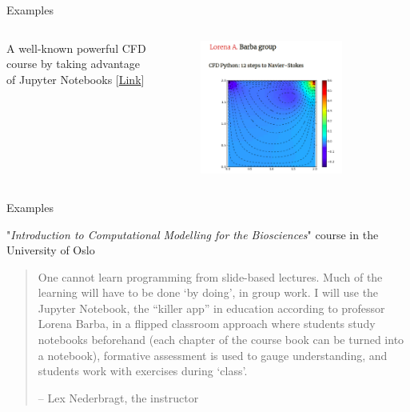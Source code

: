\documentclass[11pt,t]{beamer}
\begin{document}
\begin{frame}[fragile]{Examples}  

	\begin{columns}[t]
		\begin{column}{.3\textwidth}
		A well-known powerful CFD course by taking advantage of Jupyter Notebooks [\href{https://github.com/barbagroup/CFDPython}{Link}]
	
 
		\end{column}
		\begin{column}{.7\textwidth}
			\vspace{-55pt}
			\begin{figure}
			\centering
			\includegraphics[width=0.80\textwidth]{jupyter_ex_cfd}
			
			\end{figure}
		\end{column}
	\end{columns}	
		
\end{frame}

\begin{frame}[fragile]{Examples}  

"\emph{Introduction to Computational Modelling for the Biosciences}" course in the University of Oslo

\begin{quotation}
One cannot learn programming from slide-based lectures. Much of the learning will have to be done ‘by doing’, in group work. I will use the Jupyter Notebook, the “killer app” in education according to professor Lorena Barba, in a flipped classroom approach where students study notebooks beforehand (each chapter of the course book can be turned into a notebook), formative assessment is used to gauge understanding, and students work with exercises during ‘class’.
	
	\raggedleft	\normalfont --  Lex Nederbragt, the instructor
\end{quotation}

\end{frame}
\end{document}
